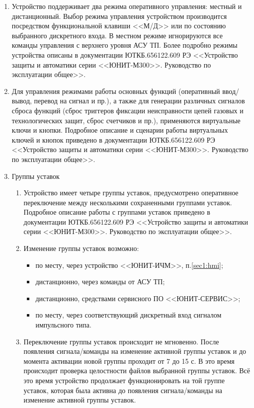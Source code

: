 \begin{enumerate}
\item
Устройство поддерживает два режима оперативного управления: местный и дистанционный. Выбор режима управления устройством производится посредством функциональной клавиши <<М/Д>> или по состоянию выбранного дискретного входа. В местном режиме игнорируются все команды управления с верхнего уровня АСУ ТП. Более подробно режимы устройства описаны в документации ЮТКБ.656122.609 РЭ <<Устройство защиты и автоматики серии <<ЮНИТ-М300>>. Руководство по эксплуатации общее>>.
\item
Для управления режимами работы основных функций (оперативный ввод/вывод, перевод на сигнал и пр.), а также для генерации различных сигналов сброса функций (сброс триггеров фиксации неисправности цепей газовых и технологических защит, сброс счетчиков и пр.), применяются виртуальные ключи и кнопки. Подробное описание и сценарии работы виртуальных ключей и кнопок приведено в документации ЮТКБ.656122.609 РЭ <<Устройство защиты и автоматики серии <<ЮНИТ-М300>>. Руководство по эксплуатации общее>>. 


\item Группы уставок
\begin{enumerate}

\item Устройство имеет четыре группы уставок, предусмотрено оперативное переключение между несколькими сохраненными группами уставок. Подробное описание работы с группами уставок приведено в документации ЮТКБ.656122.609 РЭ <<Устройство защиты и автоматики серии <<ЮНИТ-М300>>. Руководство по эксплуатации общее>>.

\item
Изменение группы уставок возможно:
\begin{itemize}
    \item по месту, через устройство <<ЮНИТ-ИЧМ>>, п.\ref{sec1:hmi};
    \item дистанционно, через команды от АСУ ТП;
    \item дистанционно, средствами сервисного ПО <<ЮНИТ-СЕРВИС>>;
    \item по месту, через соответствующий дискретный вход сигналом импульсного типа.
\end{itemize}
\item
Переключение группы уставок происходит не мгновенно. После появления сигнала/команды на изменение активной группы уставок и до момента активации новой группы проходит от 7 до 15 с. В это
время происходит проверка целостности файлов выбранной группы уставок. Всё это время устройство продолжает функционировать на той группе уставок, которая была активна до появления сигнала/команды на изменение активной группы уставок.


\end{enumerate}
\end{enumerate}
